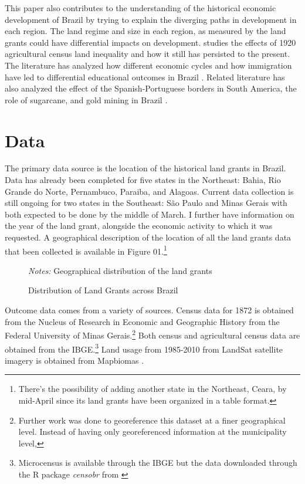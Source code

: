 \documentclass[11pt]{article}
\begin{document}
This paper also contributes to the understanding of the historical economic development of Brazil by trying to explain the diverging paths in development in each region. 
The land regime and size in each region, as measured by the land grants could have differential impacts on development.
\textcite{Wigton-Jones2020-ex} studies the effects of 1920 agricultural census land inequality and how it still has persisted to the present.
The literature has analyzed how different economic cycles and how immigration have led to differential educational outcomes in Brazil \parencites{Musacchio2014-pq}{Rocha2017-yq}.
Related literature has also analyzed the effect of the Spanish-Portuguese borders in South America, the role of sugarcane, and gold mining in Brazil \parencites{Laudares2022-vy}{Naritomi2012-or}.

\section{Data}

The primary data source is the location of the historical land grants in Brazil. Data has already been completed for five states in the Northeast: Bahia, Rio Grande do Norte, Pernambuco, Paraiba, and Alagoas.
Current data collection is still ongoing for two states in the Southeast: São Paulo and Minas Gerais with both expected to be done by the middle of March. 
I further have information on the year of the land grant, alongside the economic activity to which it was requested. 
A geographical description of the location of all the land grants data that been collected is available in Figure 01.\footnote{There's the possibility of adding another state in the Northeast, Ceara, by mid-April since its land grants have been organized in a table format.}

\begin{figure}[h!]
  \caption{Distribution of Land Grants across Brazil}
  \begin{center}
  \textit{Notes:} Geographical distribution of the land grants
  \end{center}
\end{figure}

Outcome data comes from a variety of sources.
Census data for 1872 is obtained from the Nucleus of Research in Economic and Geographic History from the Federal University of Minas Gerais.\footnote{Further work was done to georeference this dataset at a finer geographical level. Instead of having only georeferenced information at the municipality level, }
Both census and agricultural census data are obtained from the IBGE.\footnote{Microcensus is available through the IBGE but the data downloaded through the R package \textit{censobr} from \textcite{Pereira2023-qv}}
Land usage from 1985-2010 from LandSat satellite imagery is obtained from Mapbiomas \parencite{Souza2020-kb}.
\end{document}
